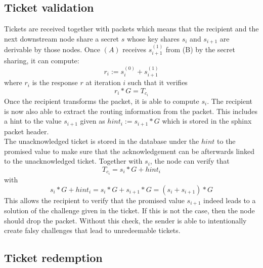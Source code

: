 \subsection{Ticket validation}
Tickets are received together with packets which means that the recipient and the next downstream node share a secret $s$ whose key shares $s_i$ and $s_{i+1}$ are derivable by those nodes.
\newline Once $(A)$ receives $s_{i+1}^{(1)}$ from (B) by the secret sharing, it can compute: $$r_i:=s_i^{(0)}+s_{i+1}^{(1)}$$ where $r_i$ is the response $r$ at iteration $i$ such that it verifies  
$$r_i*G=T_{c_i}$$
Once the recipient transforms the packet, it is able to compute $s_i$. The recipient is now also able to extract the routing information from the packet. 
This includes a hint to the value $s_{i+1}$ given as $hint_i:=s_{i+1}*G$ which is stored in the sphinx packet header.
\\The unacknowledged ticket is stored in the database under the $hint$ to the promised value to make sure that the acknowledgement can be afterwards linked to the unacknowledged ticket.
\newline Together with $s_i$, the node can verify that $$T_{c_i}=s_i*G+hint_i$$ with $$s_i*G+hint_i=s_i*G+s_{i+1}*G=(s_i+s_{i+1})*G$$ 
This allows the recipient to verify that the promised value $s_{i+1}$ indeed leads to a solution of the challenge given in the ticket. 
If this is not the case, then the node should drop the packet.
\newline Without this check, the sender is able to intentionally create falsy challenges that lead to unredeemable tickets.


\subsection{Ticket redemption}


